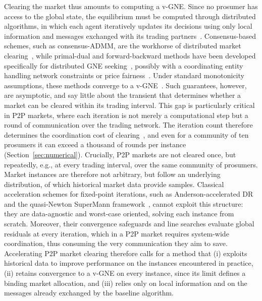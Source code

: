 \documentclass[final]{l4dc2026}
\begin{document}
Clearing the market thus amounts to computing a v-GNE. Since no prosumer has access to the global state, the equilibrium must be computed through distributed algorithms, in which each agent iteratively updates its decisions using only local information and messages exchanged with its trading partners~\citep{tushar2018transforming}. Consensus-based schemes, such as consensus-ADMM, are the workhorse of distributed market clearing~\citep{sorin2018consensus, baroche2019prosumer, moret2020loss}, while primal-dual and forward-backward methods have been developed specifically for distributed GNE seeking~\citep{belgioioso2022distributed}, possibly with a coordinating entity handling network constraints or price fairness~\citep{liu2017energy, belgioioso2022operationally, behrunani2023designing}. Under standard monotonicity assumptions, these methods converge to a v-GNE~\citep{belgioioso2022distributed, briceno2013monotone}. Such guarantees, however, are asymptotic, and say little about the transient that determines whether a market can be cleared within its trading interval. This gap is particularly critical in P2P markets, where each iteration is not merely a computational step but a round of communication over the trading network. The iteration count therefore determines the coordination cost of clearing~\citep{baroche2019prosumer},  and even for a community of ten prosumers it can exceed a thousand of rounds per instance (Section~\ref{sec:numerical}).
Crucially, P2P markets are not cleared once, but repeatedly, e.g., at every trading interval, over the same community of prosumers. Market instances are therefore not arbitrary, but follow an underlying distribution, of which historical market data provide samples.
Classical acceleration schemes for fixed-point iterations, such as Anderson-accelerated DR~\citep{fu2020anderson} and the quasi-Newton SuperMann framework~\citep{themelis2019supermann}, cannot exploit this structure: they are data-agnostic and worst-case oriented, solving each instance from scratch.
Moreover, their convergence safeguards and line searches evaluate global residuals at every iteration, which in a P2P market requires system-wide coordination, thus consuming the very communication they aim to save. Accelerating P2P market clearing therefore calls for a method that (i) exploits historical data to improve performance on the instances encountered in practice, (ii) retains convergence to a v-GNE on every instance, since its limit defines a binding market allocation, and (iii) relies only on local information and on the messages already exchanged by the baseline algorithm.
\end{document}
